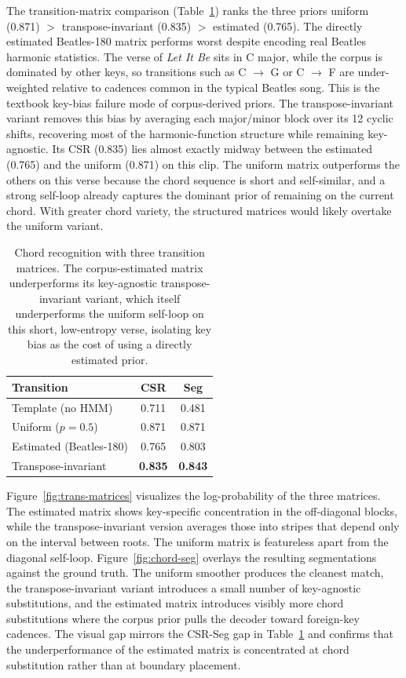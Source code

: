 \documentclass{article}
\begin{document}
The transition-matrix comparison (Table~\ref{tab:trans3}) ranks the three priors uniform (0.871) $>$ transpose-invariant (0.835) $>$ estimated (0.765). The directly estimated Beatles-180 matrix performs worst despite encoding real Beatles harmonic statistics. The verse of \textit{Let It Be} sits in C major, while the corpus is dominated by other keys, so transitions such as C $\to$ G or C $\to$ F are under-weighted relative to cadences common in the typical Beatles song. This is the textbook key-bias failure mode of corpus-derived priors. The transpose-invariant variant removes this bias by averaging each major/minor block over its 12 cyclic shifts, recovering most of the harmonic-function structure while remaining key-agnostic. Its CSR (0.835) lies almost exactly midway between the estimated (0.765) and the uniform (0.871) on this clip. The uniform matrix outperforms the others on this verse because the chord sequence is short and self-similar, and a strong self-loop already captures the dominant prior of remaining on the current chord. With greater chord variety, the structured matrices would likely overtake the uniform variant.

\begin{table}[ht]
    \centering
    \caption{Chord recognition with three transition matrices. The corpus-estimated matrix underperforms its key-agnostic transpose-invariant variant, which itself underperforms the uniform self-loop on this short, low-entropy verse, isolating key bias as the cost of using a directly estimated prior.}
    \label{tab:trans3}
    \begin{tabular}{lcc}
        \toprule
        Transition             & CSR            & Seg            \\
        \midrule
        Template (no HMM)      & 0.711          & 0.481          \\
        Uniform ($p = 0.5$)    & 0.871          & 0.871          \\
        Estimated (Beatles-180) & 0.765          & 0.803          \\
        Transpose-invariant    & \textbf{0.835} & \textbf{0.843} \\
        \bottomrule
    \end{tabular}
\end{table}

Figure~\ref{fig:trans-matrices} visualizes the log-probability of the three matrices. The estimated matrix shows key-specific concentration in the off-diagonal blocks, while the transpose-invariant version averages those into stripes that depend only on the interval between roots. The uniform matrix is featureless apart from the diagonal self-loop. Figure~\ref{fig:chord-seg} overlays the resulting segmentations against the ground truth. The uniform smoother produces the cleanest match, the transpose-invariant variant introduces a small number of key-agnostic substitutions, and the estimated matrix introduces visibly more chord substitutions where the corpus prior pulls the decoder toward foreign-key cadences. The visual gap mirrors the CSR-Seg gap in Table~\ref{tab:trans3} and confirms that the underperformance of the estimated matrix is concentrated at chord substitution rather than at boundary placement.
\end{document}
